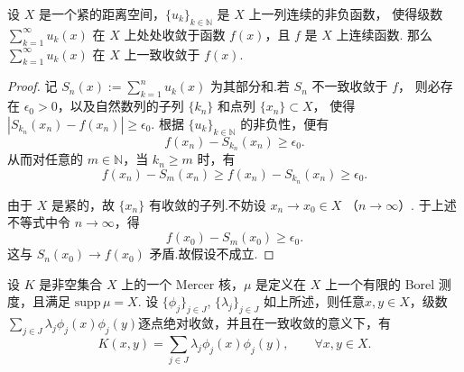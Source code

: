 \documentclass[../master.tex]{subfiles}
\begin{document}
\begin{lemma}[Dini]\label{lemma:Dini}
设 $X$ 是一个紧的距离空间，$\{u_k\}_{k\in\mathbb{N}}$ 是 $X$ 上一列连续的非负函数，
使得级数 $\sum_{k=1}^\infty u_k(x)$ 在 $X$ 上处处收敛于函数 $f(x)$，且 $f$ 是 $X$ 上连续函数.
那么 $\sum_{k=1}^\infty u_k(x)$ 在 $X$ 上一致收敛于 $f(x)$.
\end{lemma}

\begin{proof}
记 $S_n(x):=\sum_{k=1}^n u_k(x)$ 为其部分和.若 $S_n$ 不一致收敛于 $f$，
则必存在 $\epsilon_0>0$，以及自然数列的子列 $\{k_n\}$ 和点列 $\{x_n\}\subset X$，
使得 $|S_{k_n}(x_n)-f(x_n)|\ge \epsilon_0$.
根据 $\{u_k\}_{k\in\mathbb{N}}$ 的非负性，便有
\[
f(x_n)-S_{k_n}(x_n)\ge \epsilon_0.
\]
从而对任意的 $m\in\mathbb{N}$，当 $k_n\ge m$ 时，有
\[
f(x_n)-S_m(x_n)\ge f(x_n)-S_{k_n}(x_n)\ge \epsilon_0.
\]

由于 $X$ 是紧的，故 $\{x_n\}$ 有收敛的子列.不妨设 $x_n\to x_0\in X$ （$n\to\infty$）.
于上述不等式中令 $n\to\infty$，得
\[
f(x_0)-S_m(x_0)\ge \epsilon_0.
\]
这与 $S_n(x_0)\to f(x_0)$ 矛盾.故假设不成立.
\end{proof}



\begin{theorem}[Mercer 定理]\label{thm:mercer}
设 $K$ 是非空集合 $X$ 上的一个 Mercer 核，$\mu$ 是定义在 $X$ 上一个有限的 Borel 测度，且满足 $\mathrm{supp}\,\mu = X$.
设 $\{\phi_j\}_{j\in J}$, $\{\lambda_j\}_{j\in J}$ 如上所述，则任意$x,y\in X$，级数$\sum_{j\in J} \lambda_j \phi_j(x)\phi_j(y)$逐点绝对收敛，并且在一致收敛的意义下，有
\begin{equation}\label{eq:mercer}
    K(x,y) = \sum_{j\in J} \lambda_j \phi_j(x)\phi_j(y), 
    \qquad \forall x,y \in X.
\end{equation}
\end{theorem}
\end{document}
